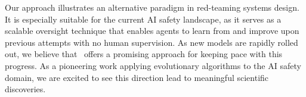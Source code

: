 
Our approach illustrates an alternative paradigm in red-teaming systems design. It is especially suitable for the current AI safety landscape, as it serves as a scalable oversight technique that enables agents to learn from and improve upon previous attempts with no human supervision. As new models are rapidly rolled out, we believe that \method~offers a promising approach for keeping pace with this progress. As a pioneering work applying evolutionary algorithms to the AI safety domain, we are excited to see this direction lead to meaningful scientific discoveries.


